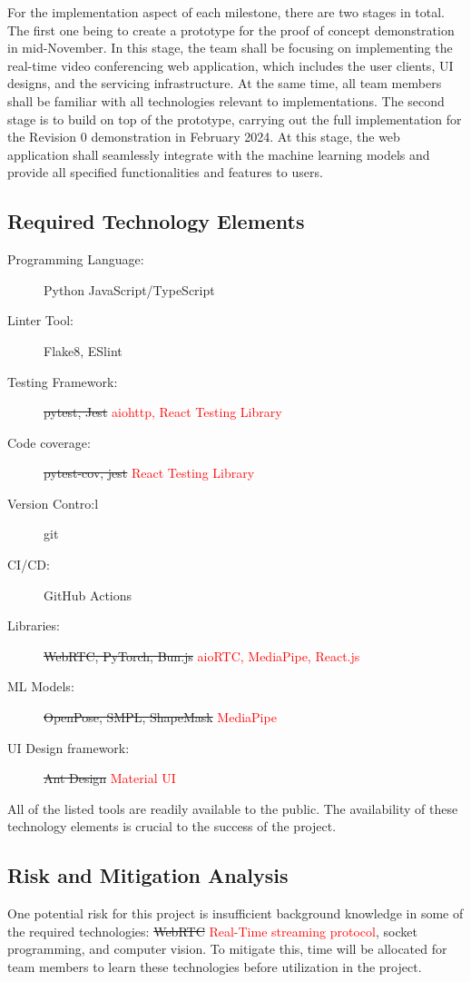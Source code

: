 \documentclass[12pt]{article}
\begin{document}
For the implementation aspect of each milestone, there are two stages in total. The first one being to create a prototype for the proof of concept demonstration in mid-November. In this stage, the team shall be focusing on implementing the real-time video conferencing web application, which includes the user clients, UI designs, and the servicing infrastructure. At the same time, all team members shall be familiar with all technologies relevant to implementations. The second stage is to build on top of the prototype, carrying out the full implementation for the Revision 0 demonstration in February 2024. At this stage, the web application shall seamlessly integrate with the machine learning models and provide all specified functionalities and features to users.

\subsection{Required Technology Elements}
\begin{description}
\item[Programming Language:] Python JavaScript/TypeScript
\item[Linter Tool:] Flake8, ESlint
\item[Testing Framework:] \sout{pytest, Jest} \textcolor{red}{aiohttp, React Testing Library} 
\item[Code coverage:] \sout{pytest-cov, jest} \textcolor{red}{React Testing Library} 
\item[Version Contro:l] git
\item[CI/CD:] GitHub Actions
\item[Libraries:] \sout{WebRTC, PyTorch, Bun.js} \textcolor{red}{aioRTC, MediaPipe, React.js} 
\item[ML Models:] \sout{OpenPose, SMPL, ShapeMask} \textcolor{red}{MediaPipe} 
\item[UI Design framework:] \sout{Ant Design} \textcolor{red}{Material UI}
\end{description}
All of the listed tools are readily available to the public. The availability of these technology elements is crucial to the success of the project.

\subsection{Risk and Mitigation Analysis}
One potential risk for this project is insufficient background knowledge in some of the required technologies: \sout{WebRTC} \textcolor{red}{Real-Time streaming protocol}, socket programming, and computer vision. To mitigate this, time will be allocated for team members to learn these technologies before utilization in the project.
\end{document}
